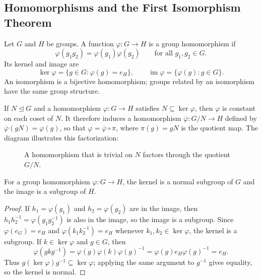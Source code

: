 \subsection{Homomorphisms and the First Isomorphism Theorem}

\begin{definition}
Let $G$ and $H$ be groups. A function $\varphi:G\to H$ is a group homomorphism if
\[
 \varphi(g_1g_2)=\varphi(g_1)\varphi(g_2)
 \qquad\text{for all }g_1,g_2\in G.
\]
Its kernel and image are
\[
 \ker\varphi=\{g\in G:\varphi(g)=e_H\},\qquad
 \operatorname{im}\varphi=\{\varphi(g):g\in G\}.
\]
An isomorphism is a bijective homomorphism; groups related by an isomorphism have the same group structure.
\end{definition}

If $N\trianglelefteq G$ and a homomorphism $\varphi:G\to H$ satisfies $N\subseteq\ker\varphi$, then $\varphi$ is constant on each coset of $N$. It therefore induces a homomorphism $\overline{\varphi}:G/N\to H$ defined by $\overline{\varphi}(gN)=\varphi(g)$, so that $\varphi=\overline{\varphi}\circ\pi$, where $\pi(g)=gN$ is the quotient map. The diagram illustrates this factorization:

\begin{figure}[H]
\centering
{}
\caption{A homomorphism that is trivial on $N$ factors through the quotient $G/N$.}
\label{fig:quotient-factorization}
\end{figure}

\begin{theorem}
For a group homomorphism $\varphi:G\to H$, the kernel is a normal subgroup of $G$ and the image is a subgroup of $H$.
\end{theorem}

\begin{proof}
If $h_1=\varphi(g_1)$ and $h_2=\varphi(g_2)$ are in the image, then $h_1h_2^{-1}=\varphi(g_1g_2^{-1})$ is also in the image, so the image is a subgroup. Since $\varphi(e_G)=e_H$ and $\varphi(k_1k_2^{-1})=e_H$ whenever $k_1,k_2\in\ker\varphi$, the kernel is a subgroup. If $k\in\ker\varphi$ and $g\in G$, then
\[
 \varphi(gkg^{-1})=\varphi(g)\varphi(k)\varphi(g)^{-1}
 =\varphi(g)e_H\varphi(g)^{-1}=e_H.
\]
Thus $g(\ker\varphi)g^{-1}\subseteq\ker\varphi$; applying the same argument to $g^{-1}$ gives equality, so the kernel is normal.
\end{proof}

